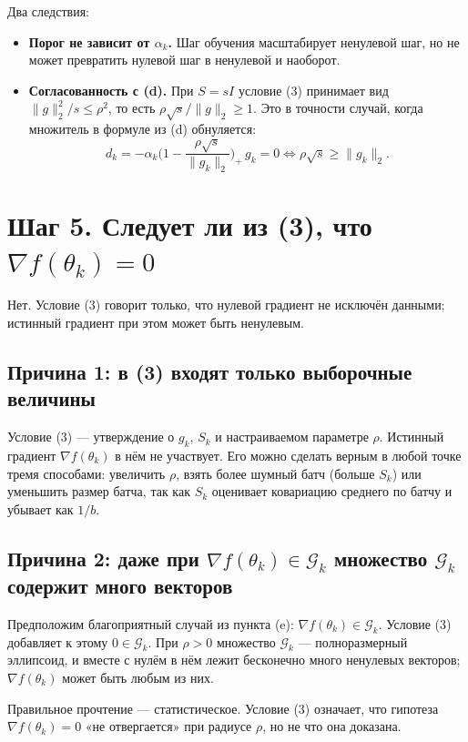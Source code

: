 \documentclass[11pt,a4paper]{article}
\newcommand{\G}{\mathcal{G}_k}
\newcommand{\norm}[1]{\lVert #1\rVert_2}
\begin{document}
Два следствия:
\begin{itemize}
\item \textbf{Порог не зависит от $\alpha_k$.} Шаг обучения масштабирует ненулевой
шаг, но не может превратить нулевой шаг в ненулевой и наоборот.
\item \textbf{Согласованность с (d).} При $S = sI$ условие (3) принимает вид
$\norm{g}^2/s \le \rho^2$, то есть $\rho\sqrt{s}/\norm{g} \ge 1$. Это в точности
случай, когда множитель в формуле из (d) обнуляется:
\begin{equation*}
d_k = -\alpha_k\Big(1 - \frac{\rho\sqrt{s}}{\norm{g_k}}\Big)_{+}\, g_k = 0
\iff \rho\sqrt{s} \ge \norm{g_k} .
\end{equation*}
\end{itemize}

\section*{Шаг 5. Следует ли из (3), что $\nabla f(\theta_k) = 0$}

Нет. Условие (3) говорит только, что нулевой градиент не исключён данными;
истинный градиент при этом может быть ненулевым.

\subsection*{Причина 1: в (3) входят только выборочные величины}

Условие (3) — утверждение о $g_k$, $S_k$ и настраиваемом параметре $\rho$.
Истинный градиент $\nabla f(\theta_k)$ в нём не участвует. Его можно сделать верным
в любой точке тремя способами: увеличить $\rho$, взять более шумный батч (больше
$S_k$) или уменьшить размер батча, так как $S_k$ оценивает ковариацию среднего по
батчу и убывает как $1/b$.

\subsection*{Причина 2: даже при $\nabla f(\theta_k) \in \G$ множество $\G$
содержит много векторов}

Предположим благоприятный случай из пункта (e): $\nabla f(\theta_k) \in \G$.
Условие (3) добавляет к этому $0 \in \G$. При $\rho > 0$ множество $\G$ —
полноразмерный эллипсоид, и вместе с нулём в нём лежит бесконечно много ненулевых
векторов; $\nabla f(\theta_k)$ может быть любым из них.

Правильное прочтение — статистическое. Условие (3) означает, что гипотеза
$\nabla f(\theta_k) = 0$ «не отвергается» при радиусе $\rho$, но не что она
доказана.
\end{document}

